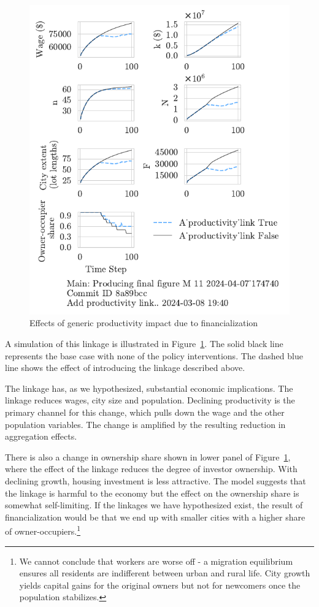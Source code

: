 \begin{figure}[h!tb] 
    \centering
    \includegraphics[scale=1, trim={0 1.4cm .8cm 0},clip]{fig/productivity_link_174740.pdf} 
    \caption{Effects of generic productivity impact due to financialization}
    \label{fig-impact-channel-example}
\end{figure}


A simulation of this linkage is illustrated in Figure~\ref{fig-impact-channel-example}. The solid black line represents the base case with none of the policy interventions. The dashed blue line shows the effect of introducing the linkage described above. 

The linkage has, as we hypothesized, substantial economic implications. The linkage reduces wages, city size and population. 
Declining productivity is the primary channel for this change, which pulls down the wage and the other population variables. The change is amplified by the resulting reduction in aggregation effects. 

There is also a change in ownership share shown in lower panel of Figure~\ref{fig-impact-channel-example}, where the effect of the linkage reduces the degree of investor ownership. With declining growth, housing investment is less attractive. The model suggests that the linkage is harmful to the economy but the effect on the ownership share is somewhat self-limiting.  If the linkages we have hypothesized exist, the result of financialization would be that we end up with smaller cities with a higher share of owner-occupiers.\footnote{We cannot conclude that workers are worse off -  a migration equilibrium ensures all residents are indifferent between urban and rural life. City growth yields capital gains for the original owners but not for newcomers once the population stabilizes.}




